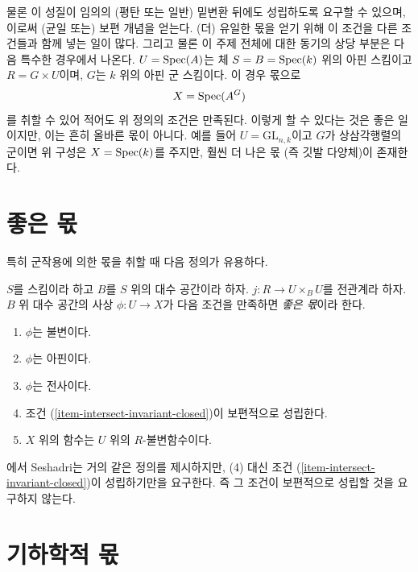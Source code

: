 \noindent
물론 이 성질이 임의의 (평탄 또는 일반) 밑변환 뒤에도 성립하도록
요구할 수 있으며, 이로써 (균일 또는) 보편 개념을 얻는다.
(더) 유일한 몫을 얻기 위해 이 조건을 다른 조건들과 함께 넣는 일이 많다.
그리고 물론 이 주제 전체에 대한 동기의 상당 부분은 다음 특수한
경우에서 나온다. $U = \mathop{\mathrm{Spec}}(A)$는 체
$S = B = \mathop{\mathrm{Spec}}(k)$ 위의 아핀 스킴이고 $R = G \times U$이며,
$G$는 $k$ 위의 아핀 군 스킴이다. 이 경우 몫으로
$$
X = \mathop{\mathrm{Spec}}(A^G)
$$
를 취할 수 있어 적어도 위 정의의 조건은 만족된다.
이렇게 할 수 있다는 것은 좋은 일이지만, 이는 흔히 올바른 몫이 아니다.
예를 들어 $U = \text{GL}_{n, k}$이고 $G$가 상삼각행렬의 군이면
위 구성은 $X = \mathop{\mathrm{Spec}}(k)$를 주지만, 훨씬 더 나은 몫
(즉 깃발 다양체)이 존재한다.







\section{좋은 몫}
\label{section-good}

\noindent
특히 군작용에 의한 몫을 취할 때 다음 정의가 유용하다.

\begin{definition}
\label{definition-good}
$S$를 스킴이라 하고 $B$를 $S$ 위의 대수 공간이라 하자.
$j : R \to U \times_B U$를 전관계라 하자.
$B$ 위 대수 공간의 사상 $\phi : U \to X$가 다음 조건을
만족하면 {\it 좋은 몫}이라 한다.
\begin{enumerate}
\item $\phi$는 불변이다.
\item $\phi$는 아핀이다.
\item $\phi$는 전사이다.
\item 조건 (\ref{item-intersect-invariant-closed})이 보편적으로 성립한다.
\item $X$ 위의 함수는 $U$ 위의 $R$-불변함수이다.
\end{enumerate}
\end{definition}

\noindent
\cite{seshadri_quotients}에서 Seshadri는 거의 같은 정의를 제시하지만,
(4) 대신 조건 (\ref{item-intersect-invariant-closed})이 성립하기만을
요구한다. 즉 그 조건이 보편적으로 성립할 것을 요구하지 않는다.







\section{기하학적 몫}
\label{section-geometric}

